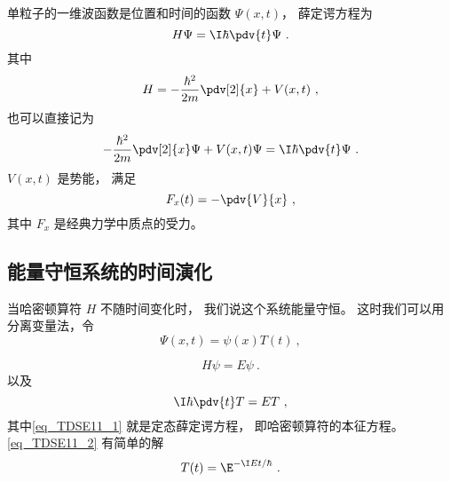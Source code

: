 
\begin{issues}
\issueDraft
\end{issues}


单粒子的一维波函数是位置和时间的函数 $\Psi(x, t)$， 薛定谔方程为
\begin{equation}\label{eq_TDSE11_6}
H\Psi = \I\hbar \pdv{t}\Psi~.
\end{equation}
其中
\begin{equation}
H = -\frac{\hbar^2}{2m}\pdv[2]{x} + V(x, t)~,
\end{equation}
也可以直接记为
\begin{equation}\label{eq_TDSE11_3}
-\frac{\hbar^2}{2m}\pdv[2]{x}\Psi + V(x, t)\Psi = \I\hbar \pdv{t}\Psi~.
\end{equation}
$V(x,t)$ 是势能， 满足
\begin{equation}
F_x(t) = -\pdv{V}{x}~,
\end{equation}
其中 $F_x$ 是经典力学中质点的受力。

\subsection{能量守恒系统的时间演化}
当哈密顿算符 $H$ 不随时间变化时， 我们说这个系统能量守恒。 这时我们可以用分离变量法，令
\begin{equation}
\Psi(x, t) = \psi(x) T(t)~,
\end{equation}
 
\begin{equation}\label{eq_TDSE11_1}
H\psi = E\psi~.
\end{equation}
以及
\begin{equation}\label{eq_TDSE11_2}
\I \hbar\pdv{t}T = ET~,
\end{equation}
其中\autoref{eq_TDSE11_1} 就是定态薛定谔方程， 即哈密顿算符的本征方程。 \autoref{eq_TDSE11_2} 有简单的解
\begin{equation}
T(t) = \E^{-\I E t/\hbar}~.
\end{equation}

